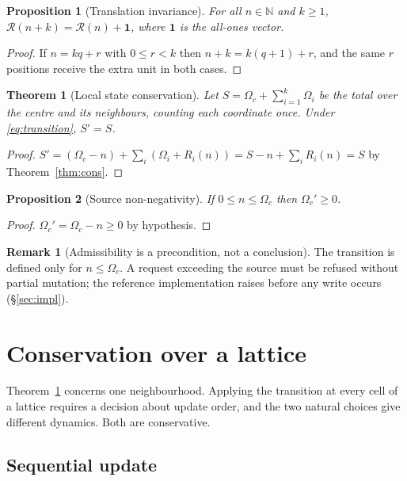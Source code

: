 \documentclass[11pt,a4paper]{article}
\newtheorem{theorem}{Theorem}
\newtheorem{proposition}{Proposition}
\theoremstyle{definition}
\newtheorem{remark}{Remark}
\newcommand{\N}{\mathbb{N}}
\newcommand{\R}{\mathcal{R}}
\newcommand{\Om}{\Omega}
\begin{document}
\begin{proposition}[Translation invariance]\label{prop:shift}
For all $n \in \N$ and $k \geq 1$, $\R(n+k) = \R(n) + \mathbf{1}$, where
$\mathbf{1}$ is the all-ones vector.
\end{proposition}
\begin{proof}
If $n = kq + r$ with $0 \leq r < k$ then $n + k = k(q+1) + r$, and the same
$r$ positions receive the extra unit in both cases.
\end{proof}

\begin{theorem}[Local state conservation]\label{thm:local}
Let $S = \Om_c + \sum_{i=1}^{k} \Om_i$ be the total over the centre and its
neighbours, counting each coordinate once. Under \eqref{eq:transition},
$S' = S$.
\end{theorem}
\begin{proof}
$S' = (\Om_c - n) + \sum_i (\Om_i + R_i(n)) = S - n + \sum_i R_i(n) = S$ by
Theorem~\ref{thm:cons}.
\end{proof}

\begin{proposition}[Source non-negativity]
If $0 \leq n \leq \Om_c$ then $\Om_c' \geq 0$.
\end{proposition}
\begin{proof}
$\Om_c' = \Om_c - n \geq 0$ by hypothesis.
\end{proof}

\begin{remark}[Admissibility is a precondition, not a conclusion]
The transition is defined only for $n \leq \Om_c$. A request exceeding the
source must be refused without partial mutation; the reference implementation
raises before any write occurs (\S\ref{sec:impl}).
\end{remark}

\section{Conservation over a lattice}\label{sec:lattice}

Theorem~\ref{thm:local} concerns one neighbourhood. Applying the transition at
every cell of a lattice requires a decision about update order, and the two
natural choices give different dynamics. Both are conservative.

\subsection{Sequential update}
\end{document}
